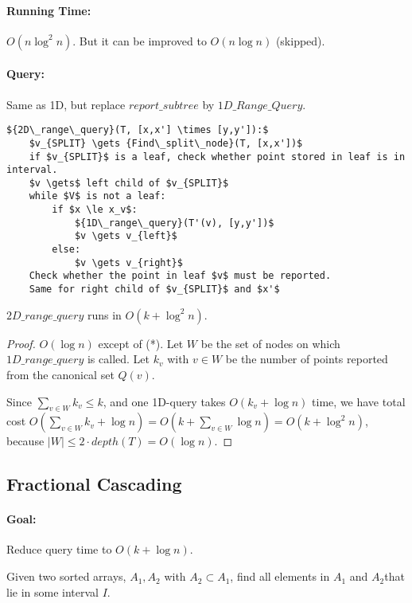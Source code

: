 \paragraph{Running Time:} $O(n \log ^2 n)$. But it can be improved to $O(n \log n)$ (skipped).

\paragraph{Query:} Same as 1D, but replace ${report\_subtree}$ by ${1D\_Range\_Query}$.

\begin{lstlisting}[mathescape]
${2D\_range\_query}(T, [x,x'] \times [y,y']):$
	$v_{SPLIT} \gets {Find\_split\_node}(T, [x,x'])$
	if $v_{SPLIT}$ is a leaf, check whether point stored in leaf is in interval.
	$v \gets$ left child of $v_{SPLIT}$
	while $V$ is not a leaf:
		if $x \le x_v$:
			${1D\_range\_query}(T'(v), [y,y'])$
			$v \gets v_{left}$
		else:
			$v \gets v_{right}$
	Check whether the point in leaf $v$ must be reported.
	Same for right child of $v_{SPLIT}$ and $x'$
\end{lstlisting}

\begin{mylemma}
${2D\_range\_query}$ runs in $O(k + \log^2 n)$.
\end{mylemma}
\begin{proof}
	$O(\log n)$ except of (*). Let $W$ be the set of nodes on which ${1D\_range\_query}$ is called. Let $k_v$ with $v \in W$ be the number of points reported from the canonical set $Q(v)$.
	
	Since $\sum_{v \in W} k_v \le k$, and one 1D-query takes $O(k_v + \log n)$ time, we have total cost $O(\sum_{v \in W} k_v + \log n) = O(k + \sum_{v \in W} \log n) = O(k + \log^2 n)$, because $|W| \le 2 \cdot {depth}(T) = O(\log n)$.
\end{proof}

\subsection{Fractional Cascading}

\paragraph{Goal:} Reduce query time to $O(k + \log n)$.

Given two sorted arrays, $A_1, A_2$ with $A_2 \subset A_1$, find all elements in $A_1$ and $A_2$that lie in some interval $I$.

